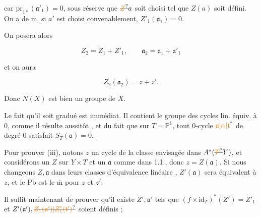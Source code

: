 car $\mathrm{pr}_{1*}(\mathfrak a'_1)=0$, sous réserve que $\deleted{\unsure{Z}}a$ soit choisi tel que $Z(a)$ soit défini. On a de $\overline{\mathrm m}$, si $a'$ est choisi convenablement, $Z'_1(\mathfrak a_1)=0$.


On posera alors

\[
Z_2=Z_1+Z'_1,\qquad\mathfrak a_2=\mathfrak a_1+\mathfrak a'_1
\]

et on aura

\[
Z_2(\mathfrak a_2)=z+z'.
\]

 Donc $N(X)$ est bien un groupe de $X$.

Le fait qu'il soit gradué est immédiat. Il contient le groupe des cycles lin. équiv. à $0$, comme il résulte aussitôt , et du fait que sur $T=\mathbb P^1$, tout $0$-cycle $\unsure{\mathfrak a|\alpha|\mathfrak{t}}$ de degré $0$ satisfait $S_T(\mathfrak a)=0$. 

Pour prouver (iii), notons $z$ un cycle de la classe envisagée dans $A^*(\deleted{\unsure{T}}Y)$, et considérons un $Z$ sur $Y\times T$ et un $\mathfrak a$ comme dans 1.1., donc $z=Z(\mathfrak a)$. Si nous changeons $Z,\mathfrak a$ dans leurs classes d'équivalence linéaire , $Z'(\mathfrak a)$ sera  équivalent à $z$, et le Pb est le $\overline{\mathrm m}$ pour $z$ et $z'$.

Il suffit maintenant de prouver  qu'il existe $Z',\mathfrak a'$ tels que $(f\times\mathrm{id}_T)^*(Z')=Z'_1$ et $Z'(\mathfrak a'),\deleted{\unsure{Z_1(\mathfrak a')|Z'_1(\mathfrak{t}')}}$ soient définis ;


